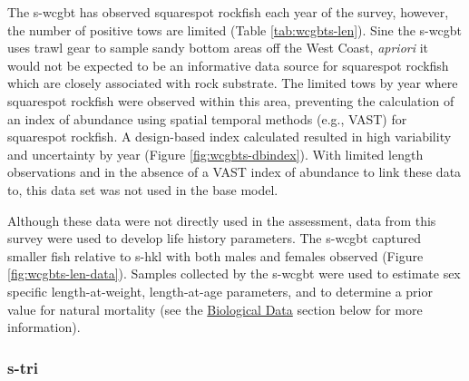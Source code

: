 \documentclass[11pt,
  english,
  a4paper,
]{article}
\begin{document}
\leavevmode\tagmcend\tagstructend\par


The \Gls{s-wcgbt} has observed squarespot rockfish each year of the survey, however, the number of positive tows are limited (Table \ref{tab:wcgbts-len}). Sine the \Gls{s-wcgbt} uses trawl gear to sample sandy bottom areas off the West Coast, \emph{apriori} it would not be expected to be an informative data source for squarespot rockfish which are closely associated with rock substrate. The limited tows by year where squarespot rockfish were observed within this area, preventing the calculation of an index of abundance using spatial temporal methods (e.g., VAST) for squarespot rockfish. A design-based index calculated resulted in high variability and uncertainty by year (Figure \ref{fig:wcgbts-dbindex}). With limited length observations and in the absence of a VAST index of abundance to link these data to, this data set was not used in the base model.

\leavevmode\tagmcend\tagstructend\par


Although these data were not directly used in the assessment, data from this survey were used to develop life history parameters. The \Gls{s-wcgbt} captured smaller fish relative to \Gls{s-hkl} with both males and females observed (Figure \ref{fig:wcgbts-len-data}). Samples collected by the \Gls{s-wcgbt} were used to estimate sex specific length-at-weight, length-at-age parameters, and to determine a prior value for natural mortality (see the {\protect\hyperlink{biological_data}{Biological Data}\leavevmode\tagmcend\tagstructend} section below for more information).

\leavevmode\tagmcend\tagstructend\par


\hypertarget{section-2}{%
\subsubsection{\texorpdfstring{\acrlong{s-tri}}{}}\label{section-2}}

\leavevmode\tagmcend\tagstructend

\end{document}
